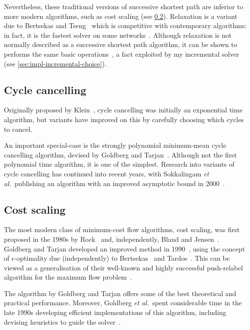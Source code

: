 Nevertheless, these traditional versions of successive shortest path are inferior to more modern algorithms, such as cost scaling (see \cref{sec:intro-related-work-cs}). Relaxation is a variant due to Bertsekas and Tseng~\cite{BertsekasMethod:1988,BertsekasCodes:1988,BertsekasTseng:94} which is competitive with contemporary algorithms: in fact, it is the fastest solver on some networks~\cite{KiralyKovacs:2012}. Although relaxation is not normally described as a successive shortest path algorithm, it can be shown to performs the same basic operations~\cite[\S9.10]{Ahuja:1993}, a fact exploited by my incremental solver (see \cref{sec:impl-incremental-choice}). 

\subsection{Cycle cancelling}

Originally proposed by Klein~\cite{Klein:1967}, cycle cancelling was initially an exponential time algorithm, but variants have improved on this by carefully choosing which cycles to cancel.

An important special-case is the strongly polynomial minimum-mean cycle cancelling algorithm, devised by Goldberg and Tarjan~\cite{Goldberg:1989}. Although not the first polynomial time algorithm, it is one of the simplest. Research into variants of cycle cancelling has continued into recent years, with Sokkalingam \textit{et al.}\ publishing an algorithm with an improved asymptotic bound in 2000~\cite{Sokkalingam:2000}.

\subsection{Cost scaling} \label{sec:intro-related-work-cs}

The most modern class of minimum-cost flow algorithms, cost scaling, was first proposed in the 1980s by Rock~\cite{Rock:1980} and, independently, Bland and Jensen~\cite{Bland:1985}. Goldberg and Tarjan developed an improved method in 1990~\cite{Goldberg:1990}, using the concept of $\epsilon$-optimality due (independently) to Bertsekas~\cite{Bertsekas:1979} and Tardos~\cite{Tardos:1985}. This can be viewed as a generalisation of their well-known and highly successful push-relabel algorithm for the maximum flow problem~\cite{Goldberg:1988}.

The algorithm by Goldberg and Tarjan offers some of the best theoretical and practical performance. Moreover, Goldberg \textit{et al.}\ spent considerable time in the late 1990s developing efficient implementations of this algorithm, including devising heuristics to guide the solver~\cite{Goldberg:1997,Bunnagel:1998}.

